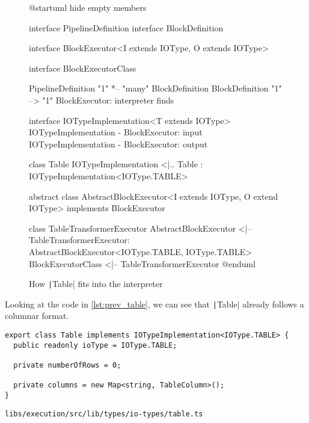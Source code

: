 \begin{figure}
	\begin{plantuml}
		@startuml
		hide empty members

		interface PipelineDefinition
		interface BlockDefinition

		interface BlockExecutor<I extends IOType, O extends IOType>

		interface BlockExecutorClass

		PipelineDefinition "1" *-- "many" BlockDefinition
		BlockDefinition "1" --> "1" BlockExecutor: interpreter finds

		interface IOTypeImplementation<T extends IOType>
		IOTypeImplementation - BlockExecutor: input
		IOTypeImplementation - BlockExecutor: output

		class Table
		IOTypeImplementation <|.. Table : IOTypeImplementation<IOType.TABLE>

		abstract class AbstractBlockExecutor<I extends IOType, O extend IOType> implements BlockExecutor

		class TableTransformerExecutor {}
		AbstractBlockExecutor <|-- TableTransformerExecutor: AbstractBlockExecutor<IOType.TABLE, IOType.TABLE>
		BlockExecutorClass <|-- TableTransformerExecutor
		@enduml
	\end{plantuml}
	\caption{How \texttt|Table| fits into the interpreter} %
	\label{fig:prev_sit}
\end{figure}

Looking at the code in \ref{lst:prev_table}, we can see that \texttt|Table| already follows a columnar format.
\begin{listing}
	\begin{verbatim}
export class Table implements IOTypeImplementation<IOType.TABLE> {
  public readonly ioType = IOType.TABLE;

  private numberOfRows = 0;

  private columns = new Map<string, TableColumn>();
}
	\end{verbatim}
	\caption{\texttt{libs/execution/src/lib/types/io-types/table.ts}} %
	\label{lst:prev_table}
\end{listing}

